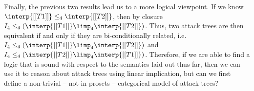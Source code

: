 Finally, the previous two results lead us to a more logical viewpoint.
If we know $\interp{[[T1]]} \leq_4 \interp{[[T2]]}$, then by closure
$I_4 \leq_4 (\interp{[[T1]]} \limp_4 \interp{[[T2]]})$.  Thus, two
attack trees are then equivalent if and only if they are
bi-conditionally related, i.e. $I_4 \leq_4 (\interp{[[T1]]} \limp_4
\interp{[[T2]]})$ and $I_4 \leq_4 (\interp{[[T2]]} \limp_4
\interp{[[T1]]})$.  Therefore, if we are able to find a logic that is
sound with respect to the semantics laid out thus far, then we can use
it to reason about attack trees using linear implication, but can we
first define a non-trivial -- not in prosets -- categorical model of
attack trees?
